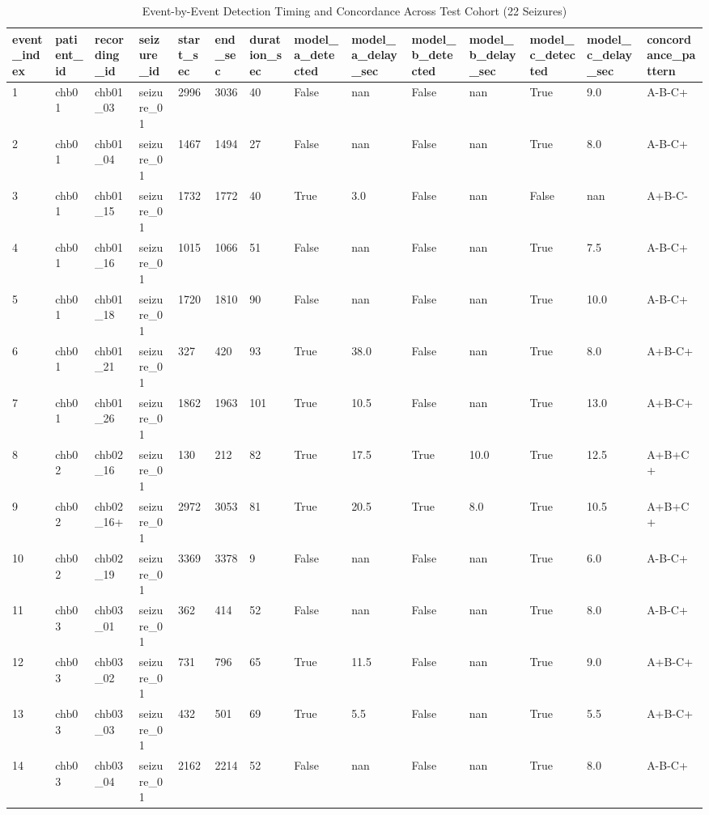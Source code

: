 \begin{table}[t]
\centering
\caption{Event-by-Event Detection Timing and Concordance Across Test Cohort (22 Seizures)}
\label{tab:event_level_detection}
\small
\begin{tabular}{llllllllllllll}
\toprule
event\_index & patient\_id & recording\_id & seizure\_id & start\_sec & end\_sec & duration\_sec & model\_a\_detected & model\_a\_delay\_sec & model\_b\_detected & model\_b\_delay\_sec & model\_c\_detected & model\_c\_delay\_sec & concordance\_pattern \\
\midrule
1 & chb01 & chb01\_03 & seizure\_01 & 2996 & 3036 & 40 & False & nan & False & nan & True & 9.0 & A-B-C+ \\
2 & chb01 & chb01\_04 & seizure\_01 & 1467 & 1494 & 27 & False & nan & False & nan & True & 8.0 & A-B-C+ \\
3 & chb01 & chb01\_15 & seizure\_01 & 1732 & 1772 & 40 & True & 3.0 & False & nan & False & nan & A+B-C- \\
4 & chb01 & chb01\_16 & seizure\_01 & 1015 & 1066 & 51 & False & nan & False & nan & True & 7.5 & A-B-C+ \\
5 & chb01 & chb01\_18 & seizure\_01 & 1720 & 1810 & 90 & False & nan & False & nan & True & 10.0 & A-B-C+ \\
6 & chb01 & chb01\_21 & seizure\_01 & 327 & 420 & 93 & True & 38.0 & False & nan & True & 8.0 & A+B-C+ \\
7 & chb01 & chb01\_26 & seizure\_01 & 1862 & 1963 & 101 & True & 10.5 & False & nan & True & 13.0 & A+B-C+ \\
8 & chb02 & chb02\_16 & seizure\_01 & 130 & 212 & 82 & True & 17.5 & True & 10.0 & True & 12.5 & A+B+C+ \\
9 & chb02 & chb02\_16+ & seizure\_01 & 2972 & 3053 & 81 & True & 20.5 & True & 8.0 & True & 10.5 & A+B+C+ \\
10 & chb02 & chb02\_19 & seizure\_01 & 3369 & 3378 & 9 & False & nan & False & nan & True & 6.0 & A-B-C+ \\
11 & chb03 & chb03\_01 & seizure\_01 & 362 & 414 & 52 & False & nan & False & nan & True & 8.0 & A-B-C+ \\
12 & chb03 & chb03\_02 & seizure\_01 & 731 & 796 & 65 & True & 11.5 & False & nan & True & 9.0 & A+B-C+ \\
13 & chb03 & chb03\_03 & seizure\_01 & 432 & 501 & 69 & True & 5.5 & False & nan & True & 5.5 & A+B-C+ \\
14 & chb03 & chb03\_04 & seizure\_01 & 2162 & 2214 & 52 & False & nan & False & nan & True & 8.0 & A-B-C+ \\

\end{tabular}
\end{table}
